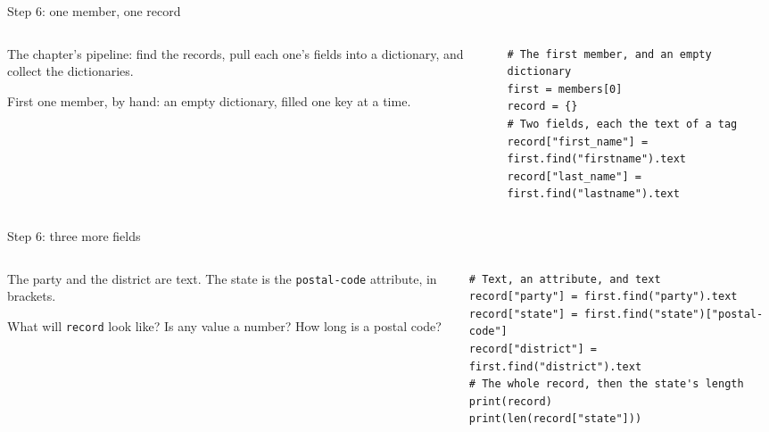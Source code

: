 \documentclass[9pt,aspectratio=169]{beamer}
\begin{document}
\begin{frame}[fragile]{Step 6: one member, one record}
    \begin{columns}[T]
        \begin{column}{0.37\textwidth}
            The chapter's pipeline: find the records, pull each one's fields into a dictionary, and collect the dictionaries.

            \medskip
            First one member, by hand: an empty dictionary, filled one key at a time.
        \end{column}
        \begin{column}{0.6\textwidth}
\begin{lstlisting}
# The first member, and an empty dictionary
first = members[0]
record = {}
# Two fields, each the text of a tag
record["first_name"] = first.find("firstname").text
record["last_name"] = first.find("lastname").text
\end{lstlisting}
        \end{column}
    \end{columns}
\end{frame}

\begin{frame}[fragile]{Step 6: three more fields}
    \begin{columns}[T]
        \begin{column}{0.37\textwidth}
            The party and the district are text. The state is the \texttt{postal-code} attribute, in brackets.

            \medskip
            What will \texttt{record} look like? Is any value a number? How long is a postal code?
        \end{column}
        \begin{column}{0.6\textwidth}
\begin{lstlisting}
# Text, an attribute, and text
record["party"] = first.find("party").text
record["state"] = first.find("state")["postal-code"]
record["district"] = first.find("district").text
# The whole record, then the state's length
print(record)
print(len(record["state"]))
\end{lstlisting}
        \end{column}
    \end{columns}
\end{frame}
\end{document}
